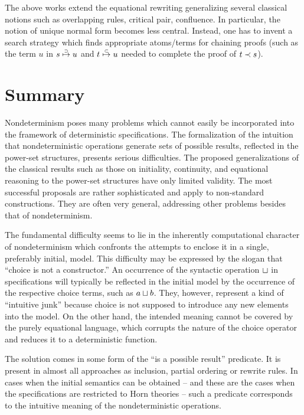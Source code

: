{The above works extend the equational rewriting generalizing several classical notions such as 
overlapping rules, critical pair, confluence. In particular, the notion of unique normal form becomes less 
central. Instead, one has to invent a search strategy which finds appropriate atoms/terms for chaining 
proofs (such as the term $u$ in $s\mathrel{\stackrel{{\scriptscriptstyle{\supset}}}{\mathrel{\mapsto}}} u$ and $t\mathrel{\stackrel{{\scriptscriptstyle{\subset}}}{\mathrel{\mapsto}}} u$ 
needed to complete the proof of $t\mathrel{\prec} s$).

\section{Summary}\label{se:sum}
Nondeterminism poses many problems which cannot easily be incorporated into the framework of 
deterministic specifications. The formalization of the intuition that nondeterministic operations generate 
sets of possible results, reflected in the power-set structures, presents serious difficulties. 
The proposed 
generalizations of the classical results such as those on initiality, continuity, and equational reasoning to 
the power-set structures have only limited validity. The most successful proposals are rather sophisticated 
and apply to non-standard constructions. They are often very general, addressing other problems besides 
that of nondeterminism. 

The fundamental difficulty seems to lie in the inherently computational character of nondeterminism 
which confronts the attempts to enclose it in a single, preferably initial, model. This difficulty may be 
expressed by the slogan that ``choice is not a constructor.'' An occurrence 
of the syntactic operation $\sqcup$ in 
specifications will typically be reflected in the initial model by the occurrence of the respective choice 
terms, such as $a\sqcup b$. They, however, represent a kind of ``intuitive junk'' because choice is not supposed to 
introduce any new elements into the model. On the other hand, the intended meaning cannot be covered 
by the purely equational language, which corrupts the nature of the choice operator and reduces it to a 
deterministic function. 

The solution comes in some form of the ``is a possible result'' predicate. It is present in almost all 
approaches as inclusion, partial ordering or rewrite rules. In cases when the initial semantics can be 
obtained -- and these are the cases when the specifications are restricted 
to Horn theories -- such a predicate 
corresponds to the intuitive meaning of the nondeterministic operations. 

}
